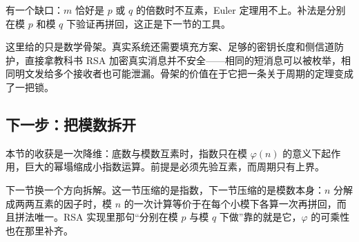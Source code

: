 有一个缺口：\(m\) 恰好是 \(p\) 或 \(q\) 的倍数时不互素，Euler 定理用不上。补法是分别在模 \(p\) 和模 \(q\) 下验证再拼回，这正是下一节的工具。

这里给的只是数学骨架。真实系统还需要填充方案、足够的密钥长度和侧信道防护，直接拿教科书 RSA 加密真实消息并不安全——相同的短消息可以被枚举，相同明文发给多个接收者也可能泄漏。骨架的价值在于它把一条关于周期的定理变成了一把锁。

\subsection{下一步：把模数拆开}

本节的收获是一次降维：底数与模数互素时，指数只在模 \(\varphi(n)\) 的意义下起作用，巨大的幂塌缩成小指数运算。前提是必须先验互素，而周期只有上界。

下一节换一个方向拆解。这一节压缩的是指数，下一节压缩的是模数本身：\(n\) 分解成两两互素的因子时，模 \(n\) 的一次计算等价于在每个小模下各算一次再拼回，而且拼法唯一。RSA 实现里那句``分别在模 \(p\) 与模 \(q\) 下做''靠的就是它，\(\varphi\) 的可乘性也在那里补齐。
